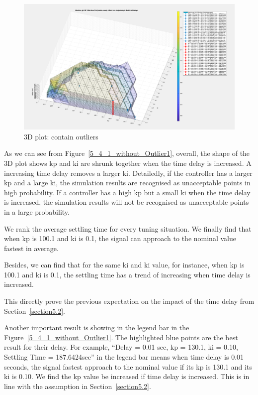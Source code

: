 \begin{figure}[htbp]
\centering
\includegraphics[width = .819\textwidth]{figure/5_4_1_without_Outlier2.png}
\caption{3D plot: contain outliers}
\label{5_4_1_without_Outlier2}
\end{figure}


As we can see from Figure~\ref{5_4_1_without_Outlier1}, overall, the shape of the 3D plot shows kp and ki are shrunk together when the time delay is increased. A increasing time delay removes a larger ki. Detailedly, if the controller has a larger kp and a large ki, the simulation results are recognised as unacceptable points in high probability. If a controller has a high kp but a small ki when the time delay is increased, the simulation results will not be recognised as unacceptable points in a large probability. 

We rank the average settling time for every tuning situation. We finally find that when kp is 100.1 and ki is 0.1, the signal can approach to the nominal value fastest in average. 

Besides, we can find that for the same ki and ki value, for instance, when kp is 100.1 and ki is 0.1, the settling time has a trend of increasing when time delay is increased.  

This directly prove the previous expectation on the impact of the time delay from Section~\ref{section5.2}.  


Another important result is showing in the legend bar in the Figure~\ref{5_4_1_without_Outlier1}. The highlighted blue points are the best result for their delay. For example, “Delay = 0.01 sec, kp = 130.1, ki = 0.10, Settling Time = 187.6424sec” in the legend bar means when time delay is 0.01 seconds, the signal fastest approach to the nominal value if its kp is 130.1 and its ki is 0.10. We find the kp value be increased if time delay is increased. This is in line with the assumption in Section~\ref{section5.2}. 

